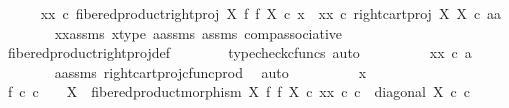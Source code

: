 \begin{isabellebody}
\isanewline
\ \ \ \ \isamarkupfalse%
\ {\isachardoublequoteopen}{\isacharparenleft}{\kern0pt}xx\ {\isasymcirc}\isactrlsub c\ fibered{\isacharunderscore}{\kern0pt}product{\isacharunderscore}{\kern0pt}right{\isacharunderscore}{\kern0pt}proj\ X\ f\ f\ X{\isacharparenright}{\kern0pt}\ {\isasymcirc}\isactrlsub c\ x\ {\isacharequal}{\kern0pt}\ xx\ {\isasymcirc}\isactrlsub c\ right{\isacharunderscore}{\kern0pt}cart{\isacharunderscore}{\kern0pt}proj\ X\ X\ {\isasymcirc}\isactrlsub c\ {\isasymlangle}a{\isacharcomma}{\kern0pt}a{\isasymrangle}{\isachardoublequoteclose}\isanewline
\ \ \ \ \ \ \isamarkupfalse%
\ xx{\isacharunderscore}{\kern0pt}assms\ x{\isacharunderscore}{\kern0pt}type\ a{\isacharunderscore}{\kern0pt}assms\ assms\ comp{\isacharunderscore}{\kern0pt}associative{}\isanewline
\ \ \ \ \ \ \isamarkupfalse%
\ fibered{\isacharunderscore}{\kern0pt}product{\isacharunderscore}{\kern0pt}right{\isacharunderscore}{\kern0pt}proj{\isacharunderscore}{\kern0pt}def\isanewline
\ \ \ \ \ \ \isamarkupfalse%
\ {\isacharparenleft}{\kern0pt}typecheck{\isacharunderscore}{\kern0pt}cfuncs{\isacharcomma}{\kern0pt}\ auto{\isacharparenright}{\kern0pt}\isanewline
\ \ \ \ \isamarkupfalse%
\ \isamarkupfalse%
\ {\isachardoublequoteopen}{\isachardot}{\kern0pt}{\isachardot}{\kern0pt}{\isachardot}{\kern0pt}\ {\isacharequal}{\kern0pt}\ xx\ {\isasymcirc}\isactrlsub c\ a{\isachardoublequoteclose}\isanewline
\ \ \ \ \ \ \isamarkupfalse%
\ a{\isacharunderscore}{\kern0pt}assms{\isacharparenleft}{\kern0pt}{}{\isacharparenright}{\kern0pt}\ right{\isacharunderscore}{\kern0pt}cart{\isacharunderscore}{\kern0pt}proj{\isacharunderscore}{\kern0pt}cfunc{\isacharunderscore}{\kern0pt}prod\ \isamarkupfalse%
\ auto\isanewline
\ \ \ \ \isamarkupfalse%
\ \isamarkupfalse%
\ {\isachardoublequoteopen}{\isachardot}{\kern0pt}{\isachardot}{\kern0pt}{\isachardot}{\kern0pt}\ {\isacharequal}{\kern0pt}\ x{\isachardoublequoteclose}\isanewline
\ \ \ \ \isamarkupfalse%
\ {\isacharminus}{\kern0pt}\isanewline
\ \ \ \ \ \ \isamarkupfalse%
\ f{}{\isacharcolon}{\kern0pt}\ {\isachardoublequoteopen}{\isasymforall}c{\isachardot}{\kern0pt}\ c\ {\isacharcolon}{\kern0pt}\ {\isasymone}\ {\isasymrightarrow}\ X\ {\isasymlongrightarrow}\ fibered{\isacharunderscore}{\kern0pt}product{\isacharunderscore}{\kern0pt}morphism\ X\ f\ f\ X\ {\isasymcirc}\isactrlsub c\ xx\ {\isasymcirc}\isactrlsub c\ c\ {\isacharequal}{\kern0pt}\ diagonal\ X\ {\isasymcirc}\isactrlsub c\ c{\isachardoublequoteclose}\isanewline

\end{isabellebody}
